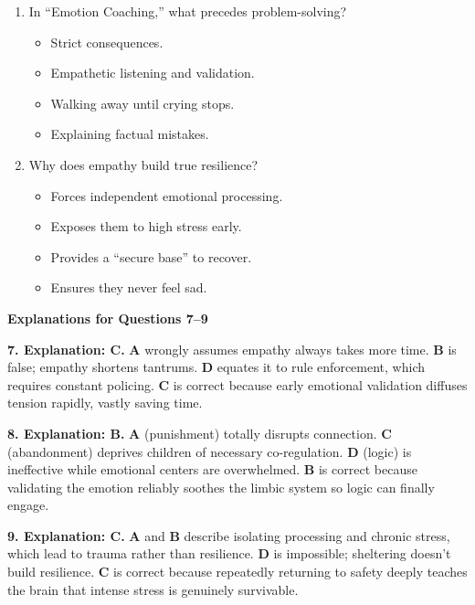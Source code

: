 \begin{practiceexercise}
\begin{enumerate}
    \item In ``Emotion Coaching,'' what precedes problem-solving?
    \begin{itemize}
        \item[A.] Strict consequences.
        \item[B.] Empathetic listening and validation.
        \item[C.] Walking away until crying stops.
        \item[D.] Explaining factual mistakes.
    \end{itemize}
    \vspace{\fill}

    \item Why does empathy build true resilience?
    \begin{itemize}
        \item[A.] Forces independent emotional processing.
        \item[B.] Exposes them to high stress early.
        \item[C.] Provides a ``secure base'' to recover.
        \item[D.] Ensures they never feel sad.
    \end{itemize}
\end{enumerate}
\vspace{\fill}
\newpage

\textbf{Explanations for Questions 7--9}

\vspace{0.5cm}
\textbf{7. Explanation: C.} \textbf{A} wrongly assumes empathy always takes more time. \textbf{B} is false; empathy shortens tantrums. \textbf{D} equates it to rule enforcement, which requires constant policing. \textbf{C} is correct because early emotional validation diffuses tension rapidly, vastly saving time.
\vspace{\fill}

\textbf{8. Explanation: B.} \textbf{A} (punishment) totally disrupts connection. \textbf{C} (abandonment) deprives children of necessary co-regulation. \textbf{D} (logic) is ineffective while emotional centers are overwhelmed. \textbf{B} is correct because validating the emotion reliably soothes the limbic system so logic can finally engage.
\vspace{\fill}

\textbf{9. Explanation: C.} \textbf{A} and \textbf{B} describe isolating processing and chronic stress, which lead to trauma rather than resilience. \textbf{D} is impossible; sheltering doesn't build resilience. \textbf{C} is correct because repeatedly returning to safety deeply teaches the brain that intense stress is genuinely survivable.
\vspace{\fill}
\end{practiceexercise}
\newpage

